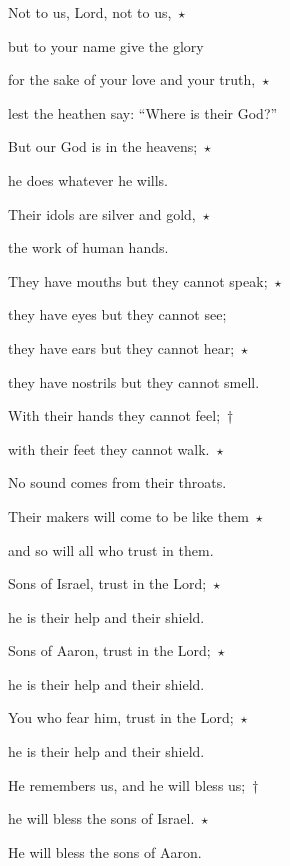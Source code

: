 \noindent Not to us, Lord, not to us,~$\star$~\nopagebreak

but to your name give the glory

\noindent for the sake of your love and your truth,~$\star$~\nopagebreak

lest the heathen say: “Where is their God?”



\noindent But our God is in the heavens;~$\star$~\nopagebreak

he does whatever he wills.

\noindent Their idols are silver and gold,~$\star$~\nopagebreak

the work of human hands.



\noindent They have mouths but they cannot speak;~$\star$~\nopagebreak

they have eyes but they cannot see;

\noindent they have ears but they cannot hear;~$\star$~\nopagebreak

they have nostrils but they cannot smell.



\noindent With their hands they cannot feel;~†~

with their feet they cannot walk.~$\star$~\nopagebreak

No sound comes from their throats.



\noindent Their makers will come to be like them~$\star$~\nopagebreak

and so will all who trust in them.



\noindent Sons of Israel, trust in the Lord;~$\star$~\nopagebreak

he is their help and their shield.

\noindent Sons of Aaron, trust in the Lord;~$\star$~\nopagebreak

he is their help and their shield.



\noindent You who fear him, trust in the Lord;~$\star$~\nopagebreak

he is their help and their shield.

\noindent He remembers us, and he will bless us;~†~

he will bless the sons of Israel.~$\star$~\nopagebreak

He will bless the sons of Aaron.



